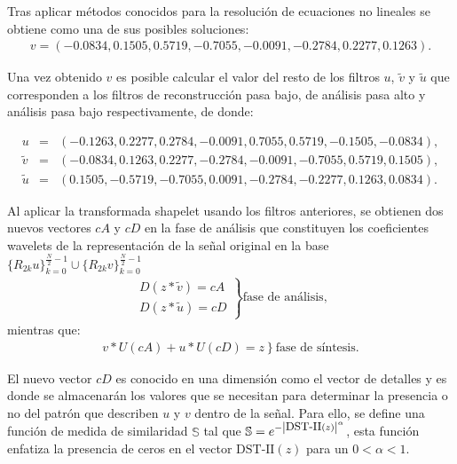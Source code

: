 \par Tras aplicar m\'etodos conocidos para la resoluci\'on de ecuaciones no lineales se obtiene como una de sus posibles soluciones:
\begin{eqnarray}
v = (-0.0834,0.1505,0.5719,-0.7055,-0.0091,-0.2784,0.2277,0.1263).\nonumber
\end{eqnarray}

\par Una vez obtenido $v$ es posible calcular el valor del resto de los filtros $u$, $\tilde{v}$ y $\tilde{u}$ que corresponden a los filtros de reconstrucci\'on pasa bajo, de an\'alisis pasa alto y an\'alisis pasa bajo respectivamente, de donde:

\begin{eqnarray}
u&=&(-0.1263,0.2277,0.2784,-0.0091,0.7055,0.5719,-0.1505,-0.0834),\nonumber\\
\tilde{v}&=&(-0.0834,0.1263,0.2277,-0.2784,-0.0091,-0.7055,0.5719,0.1505),\nonumber\\
\tilde{u}&=&(0.1505,-0.5719,-0.7055,0.0091,-0.2784,-0.2277,0.1263,0.0834).\nonumber
\end{eqnarray}

\par Al aplicar la transformada shapelet usando los filtros anteriores, se obtienen dos nuevos vectores $cA$ y $cD$ en la fase de an\'alisis que constituyen los coeficientes wavelets de la representaci\'on de la se\~nal original en la base $\{R_{2k}u\}_{k=0}^{\frac{N}{2}-1} \cup \{R_{2k}v\}_{k=0}^{\frac{N}{2}-1}$
\begin{eqnarray}
\left.\begin{array}{r}
D(z\ast\tilde{v})=cA\\
D(z\ast\tilde{u})=cD
\end{array}\right\}\mbox{fase de an\'alisis,}\nonumber
\end{eqnarray}
mientras que:
\begin{eqnarray}
\left.v\ast U(cA)+u\ast U(cD)=z\right\}\mbox{fase de s\'intesis.}\nonumber
\end{eqnarray}

\par El nuevo vector $cD$ es conocido en una dimensi\'on como el vector de detalles y es donde se almacenar\'an los valores que se necesitan para determinar la presencia o no del patr\'on que describen $u$ y $v$ dentro de la se\~nal. Para ello, se define una funci\'on de medida de similaridad $\mathbb{S}$ tal que $\mathbb{S}=e^{-\left|\mbox{\small{DST-II}}(z)\right|^{\alpha}}$, esta funci\'on enfatiza la presencia de ceros en el vector $\mbox{DST-II}(z)$ para un $0<\alpha<1$.

